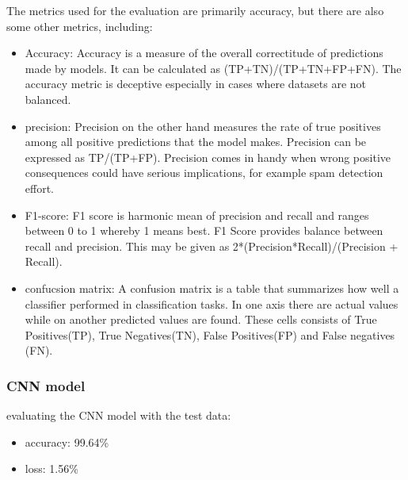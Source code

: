 The metrics used for the evaluation are primarily accuracy, but there are also some other metrics, including:
\begin{itemize}
	\item Accuracy: Accuracy is a measure of the overall correctitude of predictions made by models. It can be calculated as (TP+TN)/(TP+TN+FP+FN). The accuracy metric is deceptive especially in cases where datasets are not balanced.
	\item precision: Precision on the other hand measures the rate of true positives among all positive predictions that the model makes. Precision can be expressed as TP/(TP+FP). Precision comes in handy when wrong positive consequences could have serious implications, for example spam detection effort.
	\item F1-score: F1 score is harmonic mean of precision and recall and ranges between 0 to 1 whereby 1 means best. F1 Score provides balance between recall and precision. This may be given as 2*(Precision*Recall)/(Precision + Recall).
	\item confucsion matrix: A confusion matrix is a table that summarizes how well a classifier performed in classification tasks. In one axis there are actual values while on another predicted values are found. These cells consists of True Positives(TP), True Negatives(TN), False Positives(FP) and False negatives (FN).
\end{itemize}












\subsubsection{CNN model}
evaluating the CNN model with the test data:
\firmlist
		\begin{itemize}
			\item accuracy: 99.64\%
			\item loss: 1.56\%
		\end{itemize}
		\newpage


